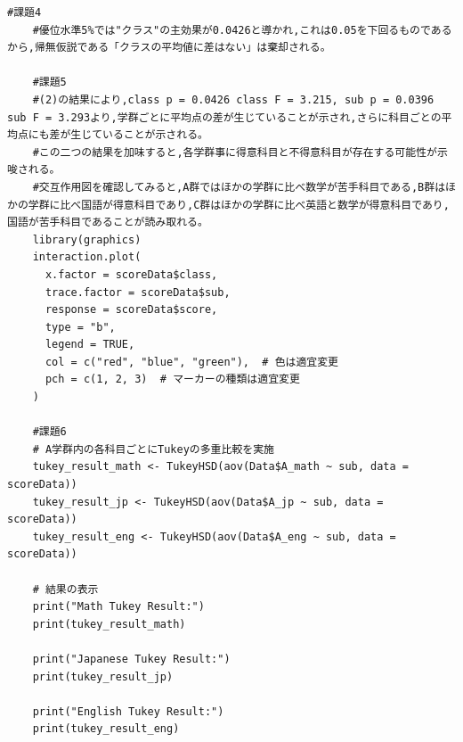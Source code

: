 \documentclass[fontsize = 10pt, paper= a4,twocolumn,column_gap=5zw]{jlreq}
\begin{document}
\begin{lstlisting}[basicstyle=\ttfamily\footnotesize, frame=single, caption=s2212022-1.c ,label=s2212022-1.c]
    #課題4
    #優位水準5%では"クラス"の主効果が0.0426と導かれ,これは0.05を下回るものであるから,帰無仮説である「クラスの平均値に差はない」は棄却される。
    
    #課題5
    #(2)の結果により,class p = 0.0426 class F = 3.215, sub p = 0.0396 sub F = 3.293より,学群ごとに平均点の差が生じていることが示され,さらに科目ごとの平均点にも差が生じていることが示される。
    #この二つの結果を加味すると,各学群事に得意科目と不得意科目が存在する可能性が示唆される。
    #交互作用図を確認してみると,A群ではほかの学群に比べ数学が苦手科目である,B群はほかの学群に比べ国語が得意科目であり,C群はほかの学群に比べ英語と数学が得意科目であり,国語が苦手科目であることが読み取れる。
    library(graphics)
    interaction.plot(
      x.factor = scoreData$class,
      trace.factor = scoreData$sub,
      response = scoreData$score,
      type = "b",
      legend = TRUE,
      col = c("red", "blue", "green"),  # 色は適宜変更
      pch = c(1, 2, 3)  # マーカーの種類は適宜変更
    )
    
    #課題6
    # A学群内の各科目ごとにTukeyの多重比較を実施
    tukey_result_math <- TukeyHSD(aov(Data$A_math ~ sub, data = scoreData))
    tukey_result_jp <- TukeyHSD(aov(Data$A_jp ~ sub, data = scoreData))
    tukey_result_eng <- TukeyHSD(aov(Data$A_eng ~ sub, data = scoreData))
    
    # 結果の表示
    print("Math Tukey Result:")
    print(tukey_result_math)
    
    print("Japanese Tukey Result:")
    print(tukey_result_jp)
    
    print("English Tukey Result:")
    print(tukey_result_eng)
    
    \end{lstlisting}
\end{document}
